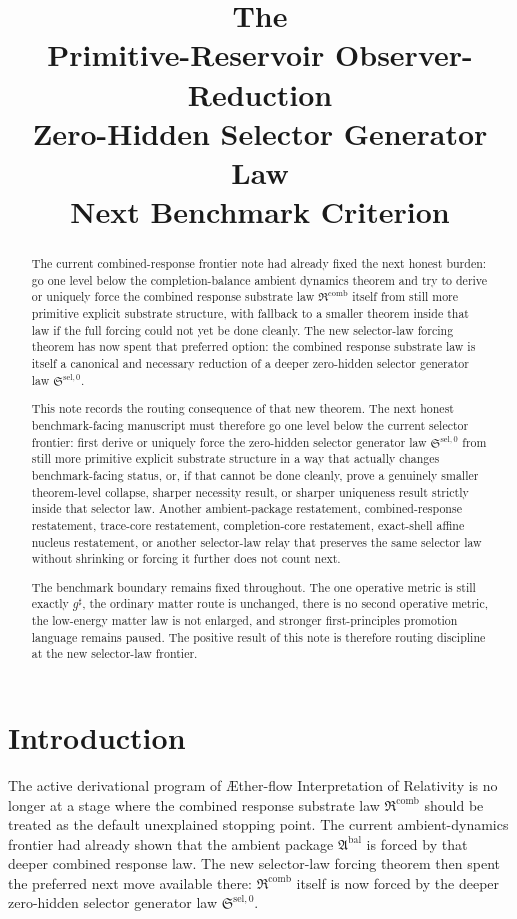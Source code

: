 \documentclass[11pt]{article}
\title{\textbf{The \TheoryName{}}\\[0.4em]
\large Primitive-Reservoir Observer-Reduction\\
\large Zero-Hidden Selector Generator Law\\
\large Next Benchmark Criterion}
\author{}
\date{}
\newcommand{\Aflow}{\AE{}ther-flow}
\newcommand{\TheoryName}{\Aflow{} Interpretation of Relativity}
\newcommand{\CompletedMetric}{g^{\sharp}}
\newcommand{\AmbientPackage}{\mathfrak A^{\mathrm{bal}}}
\newcommand{\CombinedLaw}{\mathfrak R^{\mathrm{comb}}}
\newcommand{\SelectorLaw}{\mathfrak S^{\mathrm{sel},0}}
\begin{document}
\maketitle

\begin{abstract}
The current combined-response frontier note had already fixed the next honest burden: go one level below the completion-balance ambient dynamics theorem and try to derive or uniquely force the combined response substrate law \(\CombinedLaw\) itself from still more primitive explicit substrate structure, with fallback to a smaller theorem inside that law if the full forcing could not yet be done cleanly. The new selector-law forcing theorem has now spent that preferred option: the combined response substrate law is itself a canonical and necessary reduction of a deeper zero-hidden selector generator law \(\SelectorLaw\).

This note records the routing consequence of that new theorem. The next honest benchmark-facing manuscript must therefore go one level below the current selector frontier: first derive or uniquely force the zero-hidden selector generator law \(\SelectorLaw\) from still more primitive explicit substrate structure in a way that actually changes benchmark-facing status, or, if that cannot be done cleanly, prove a genuinely smaller theorem-level collapse, sharper necessity result, or sharper uniqueness result strictly inside that selector law. Another ambient-package restatement, combined-response restatement, trace-core restatement, completion-core restatement, exact-shell affine nucleus restatement, or another selector-law relay that preserves the same selector law without shrinking or forcing it further does not count next.

The benchmark boundary remains fixed throughout. The one operative metric is still exactly \(\CompletedMetric\), the ordinary matter route is unchanged, there is no second operative metric, the low-energy matter law is not enlarged, and stronger first-principles promotion language remains paused. The positive result of this note is therefore routing discipline at the new selector-law frontier.
\end{abstract}

\section{Introduction}

The active derivational program of \TheoryName{} is no longer at a stage where the combined response substrate law \(\CombinedLaw\) should be treated as the default unexplained stopping point. The current ambient-dynamics frontier had already shown that the ambient package \(\AmbientPackage\) is forced by that deeper combined response law. The new selector-law forcing theorem then spent the preferred next move available there: \(\CombinedLaw\) itself is now forced by the deeper zero-hidden selector generator law \(\SelectorLaw\).
\end{document}
